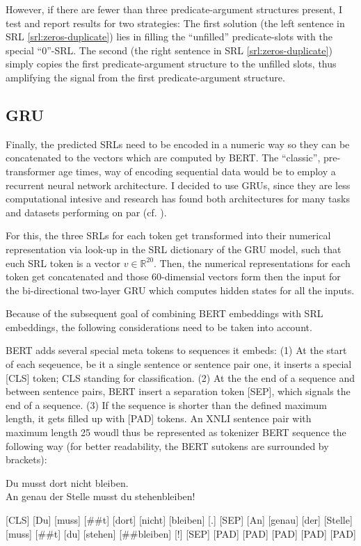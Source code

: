 However, if there are fewer than three predicate-argument structures
present, I test and report results for two strategies: The first solution (the left sentence
in SRL \ref{srl:zeros-duplicate}) lies in filling the ``unfilled'' predicate-slots with the
special ``0''-SRL. The second (the right sentence in SRL \ref{srl:zeros-duplicate}) simply
copies the first predicate-argument structure to the unfilled slots, thus amplifying the signal
from the first predicate-argument structure.



\subsection{GRU}

Finally, the predicted SRLs need to be encoded in a numeric way so they can be concatenated
to the vectors which are computed by BERT. The ``classic'', pre-transformer age times, way
of encoding sequential data would be to employ a recurrent neural network architecture.
I decided to use GRUs, since they are less computational intesive and research has found
both architectures for many tasks and datasets performing on par (cf. \cite{chung2014empirical}).

For this, the three SRLs for each token get transformed into their numerical representation
via look-up in the SRL dictionary of the GRU model, such that euch SRL token is a vector $v \in
\mathbb{R}^{20}$. Then, the numerical representations for each token get concatenated and
those 60-dimensial vectors form then the input for the bi-directional two-layer GRU which
computes hidden states for all the inputs.

Because of the subsequent goal of combining BERT embeddings with SRL embeddings, the following
considerations need to be taken into account.


BERT adds several special meta tokens to sequences it embeds: (1) At the start of each
seqeuence, be it a single sentence or sentence pair one, it inserts a special [CLS] token; CLS
standing for classification. (2) At the the end of a sequence and between sentence pairs, BERT
insert a separation token [SEP], which signals the end of a sequence. (3) If the sequence
is shorter than the defined maximum length, it gets filled up with [PAD] tokens. An XNLI sentence
pair with maximum length 25 woudl thus be represented as tokenizer BERT sequence the following
way (for better readability, the BERT sutokens are surrounded by brackets):

\begin{examples}
  \item Du musst dort nicht bleiben.\\
        An genau der Stelle musst du stehenbleiben!

        [CLS] [Du] [muss] [\#\#t] [dort] [nicht] [bleiben] [.] [SEP] [An] [genau] [der] [Stelle] [muss] [\#\#t] [du] [stehen] [\#\#bleiben] [!] [SEP] [PAD]  [PAD]  [PAD]  [PAD]  [PAD]
\end{examples}

